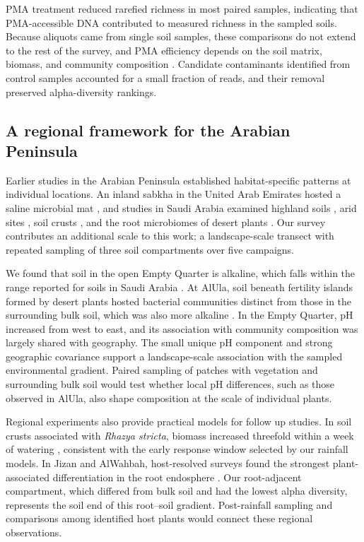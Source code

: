 \documentclass[fleqn,10pt,numbers]{olplainarticle}
\begin{document}
PMA treatment reduced rarefied richness in most paired samples, indicating that PMA-accessible DNA contributed to measured richness in the sampled soils. Because aliquots came from single soil samples, these comparisons do not extend to the rest of the survey, and PMA efficiency depends on the soil matrix, biomass, and community composition \cite{wang2021pma}. Candidate contaminants identified from control samples accounted for a small fraction of reads, and their removal preserved alpha-diversity rankings.

\subsection*{A regional framework for the Arabian Peninsula}

Earlier studies in the Arabian Peninsula established habitat-specific patterns at individual locations. An inland sabkha in the United Arab Emirates hosted a saline microbial mat \cite{mckay2016sabkha}, and studies in Saudi Arabia examined highland soils \cite{yasir2015elevation}, arid sites \cite{khan2020saudi}, soil crusts \cite{aslam2016rainfall}, and the root microbiomes of desert plants \cite{eida2018desertplants}. Our survey contributes an additional scale to this work; a landscape-scale transect with repeated sampling of three soil compartments over five campaigns.

We found that soil in the open Empty Quarter is alkaline, which falls within the range reported for soils in Saudi Arabia \cite{khan2020saudi}. At AlUla, soil beneath fertility islands formed by desert plants hosted bacterial communities distinct from those in the surrounding bulk soil, which was also more alkaline \cite{maurice2023fertility}. In the Empty Quarter, pH increased from west to east, and its association with community composition was largely shared with geography. The small unique pH component and strong geographic covariance support a landscape-scale association with the sampled environmental gradient. Paired sampling of patches with vegetation and surrounding bulk soil would test whether local pH differences, such as those observed in AlUla, also shape composition at the scale of individual plants.

Regional experiments also provide practical models for follow up studies. In soil crusts associated with \textit{Rhazya stricta}, biomass increased threefold within a week of watering \cite{aslam2016rainfall}, consistent with the early response window selected by our rainfall models. In Jizan and AlWahbah, host-resolved surveys found the strongest plant-associated differentiation in the root endosphere \cite{eida2018desertplants}. Our root-adjacent compartment, which differed from bulk soil and had the lowest alpha diversity, represents the soil end of this root--soil gradient. Post-rainfall sampling and comparisons among identified host plants would connect these regional observations.
\end{document}
